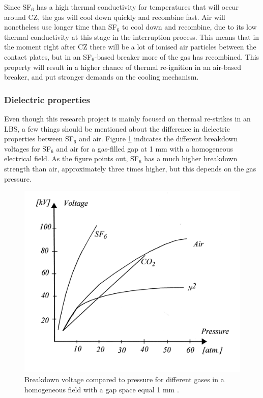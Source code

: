 \documentclass[10pt,a4paper,twoside]{article}
\begin{document}
Since SF${_6}$ has a high thermal conductivity for temperatures that will occur around CZ, the gas will cool down quickly and recombine fast. Air will nonetheless use longer time than SF${_6}$ to cool down and recombine, due to its low thermal conductivity at this stage in the interruption process. This means that in the moment right after CZ there will be a lot of ionised air particles between the contact plates, but in an SF${_6}$-based breaker more of the gas has recombined. This property will result in a higher chance of thermal re-ignition in an air-based breaker, and put stronger demands on the cooling mechanism.

\subsubsection*{Dielectric properties} 

Even though this research project is mainly focused on thermal re-strikes in an LBS, a few things should be mentioned about the difference in dielectric properties between SF${_6}$ and air. Figure \ref{fig:breakDownVoltage} indicates the different breakdown voltages for SF$_6$ and air for a gas-filled gap at 1 mm with a homogeneous electrical field. As the figure points out, SF$_6$ has a much higher breakdown strength than air, approximately three times higher, but this depends on the gas pressure.

\begin{figure}[H]
\centering
\includegraphics[scale=1]{Bilder/Discussion/Breakdown_voltage.png}
\caption{Breakdown voltage compared to pressure for different gases in a homogeneous field with a gap space equal 1 mm  \cite{bib:TET4160HVIM}.} \label{fig:breakDownVoltage}
\end{figure}
\end{document}
